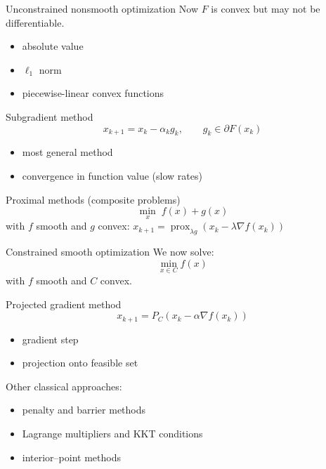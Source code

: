 \documentclass[aspectratio=169]{beamer}
\begin{document}
\begin{frame}{Unconstrained nonsmooth optimization}
Now $F$ is convex but may not be differentiable.
\pause
\begin{itemize}
    \item absolute value
    \item $\ell_1$ norm
    \item piecewise-linear convex functions
\end{itemize}
\pause
\begin{block}{Subgradient method}
\[
x_{k+1}=x_k-\alpha_k g_k,
\qquad g_k\in \partial F(x_k)
\]
\end{block}
\vspace{-5mm}
\begin{itemize}
    \item most general method
    \item convergence in function value (slow rates)
\end{itemize}
\pause
\begin{block}{Proximal methods (composite problems)}
\[
\min_x \; f(x)+g(x)
\]
with $f$ smooth and $g$ convex: $
x_{k+1} = \operatorname{prox}_{\lambda g}\left(x_k-\lambda\nabla f(x_k)\right)
$
\end{block}
\end{frame}


\begin{frame}{Constrained smooth optimization}
We now solve:
\[
\min_{x\in C} f(x)
\]
with $f$ smooth and $C$ convex.
\pause
\begin{block}{Projected gradient method}
\[
x_{k+1}
=
P_C\left(x_k-\alpha\nabla f(x_k)\right)
\]
\end{block}
\pause
\begin{itemize}
    \item gradient step
    \item projection onto feasible set
\end{itemize}

Other classical approaches:
\begin{itemize}
    \item penalty and barrier methods
    \item Lagrange multipliers and KKT conditions
    \item interior–point methods
\end{itemize}
\end{frame}
\end{document}
